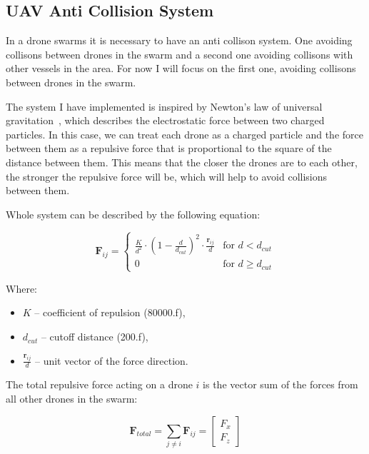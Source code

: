 \subsection{UAV Anti Collision System}

    In a drone swarms it is necessary to have an anti collison system. One avoiding collisons between drones in the swarm and a second one avoiding collisons with other vessels in the area. For now I will focus on the first one, avoiding collisons between drones in the swarm. 

    The system I have implemented is inspired by Newton's law of universal gravitation~\cite{newton1687principia}, which describes the electrostatic force between two charged particles. In this case, we can treat each drone as a charged particle and the force between them as a repulsive force that is proportional to the square of the distance between them. This means that the closer the drones are to each other, the stronger the repulsive force will be, which will help to avoid collisions between them.



    Whole system can be described by the following equation:


\begin{equation}
    \mathbf{F}_{ij} = 
    \begin{cases} 
        \frac{K}{d^2} \cdot \left( 1 - \frac{d}{d_{cut}} \right)^2 \cdot \frac{\mathbf{r}_{ij}}{d} & \text{for } d < d_{cut} \\ 
        0 & \text{for } d \geq d_{cut} 
    \end{cases}
\end{equation}

Where:
\begin{itemize}
    \item $K$ -- coefficient of repulsion (80000.f),
    \item $d_{cut}$ -- cutoff distance (200.f),
    \item $\frac{\mathbf{r}_{ij}}{d}$ -- unit vector of the force direction.
\end{itemize}


The total repulsive force acting on a drone $i$ is the vector sum of the forces from all other drones in the swarm:

\begin{equation}
\mathbf{F}_{total} = \sum_{j \neq i} \mathbf{F}_{ij} = \begin{bmatrix} F_x \\ F_z 
\end{bmatrix}
\end{equation}


